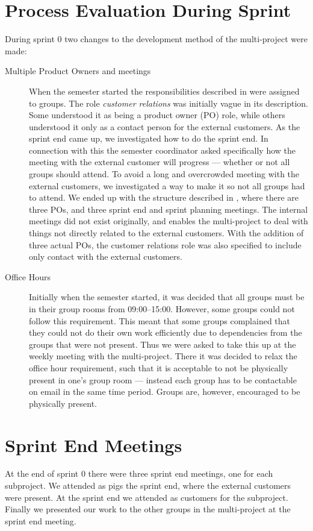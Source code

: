 \section{Process Evaluation During Sprint}
During sprint 0 two changes to the development method of the multi-project were made:

\begin{description}
  \item[Multiple Product Owners and meetings] When the semester started the responsibilities described in  were assigned to groups. The role \emph{customer relations} was initially vague in its description. Some understood it as being a product owner (PO) role, while others understood it only as a contact person for the external customers. As the sprint end came up, we investigated how to do the sprint end. In connection with this the semester coordinator asked specifically how the meeting with the external customer will progress --- whether or not all groups should attend. To avoid a long and overcrowded meeting with the external customers, we investigated a way to make it so not all groups had to attend. We ended up with the structure described in , where there are three POs, and three sprint end and sprint planning meetings. The internal meetings did not exist originally, and enables the multi-project to deal with things not directly related to the external customers. With the addition of three actual POs, the customer relations role was also specified to include only contact with the external customers.
  \item[Office Hours] Initially when the semester started, it was decided that all groups must be in their group rooms from 09:00--15:00. However, some groups could not follow this requirement. This meant that some groups complained that they could not do their own work efficiently due to dependencies from the groups that were not present. Thus we were asked to take this up at the weekly meeting with the multi-project. There it was decided to relax the office hour requirement, such that it is acceptable to not be physically present in one's group room --- instead each group has to be contactable on email in the same time period. Groups are, however, encouraged to be physically present.
\end{description}

\section{Sprint End Meetings}
At the end of sprint 0 there were three sprint end meetings, one for each subproject. We attended as pigs the \gui sprint end, where the external customers were present. At the \db sprint end we attended as customers for the \db subproject. Finally we presented our work to the other groups in the multi-project at the \bd sprint end meeting.

